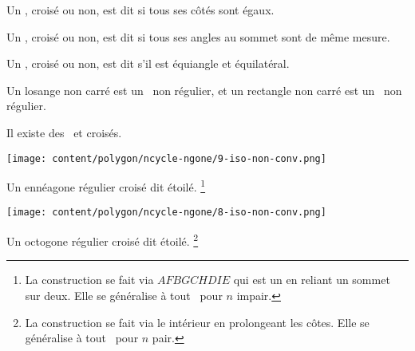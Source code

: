 

\begin{defi}
	Un \ngone, croisé ou non, est dit  si tous ses côtés sont égaux.
\end{defi}


\begin{defi}
	Un \ngone, croisé ou non, est dit  si tous ses angles au sommet sont de même mesure.
\end{defi}


\begin{defi}
	Un \ngone, croisé ou non, est dit  s'il est équiangle et équilatéral.
\end{defi}


\begin{remark}
	Un losange non carré est un \nequi\ non régulier, et un rectangle non carré est un \niso\ non régulier.
\end{remark}


\begin{remark}
	Il existe des \nregs\ et croisés.

    \vspace{-1.5em}
    
    \begin{multicols}{2}
    	\small\itshape\centering
    	
	    \null\vfill

	    \texttt{[image: content/polygon/ncycle-ngone/9-iso-non-conv.png]}
    
        \smallskip
        Un ennéagone régulier croisé dit étoilé.%
	    \footnote{
	        La construction se fait via $AFBGCHDIE$ qui est un  en reliant un sommet sur deux. Elle se généralise à tout \nreg\ pour $n$ impair.
	    }


    	\columnbreak
	
	    \null\vfill
	    
	    \texttt{[image: content/polygon/ncycle-ngone/8-iso-non-conv.png]}
    
        \smallskip
        Un octogone régulier croisé dit étoilé.%
	    \footnote{
	        La construction se fait via le  intérieur en prolongeant les côtes. Elle se généralise à tout \nreg\ pour $n$ pair.
	    }

    \end{multicols}
\end{remark}
